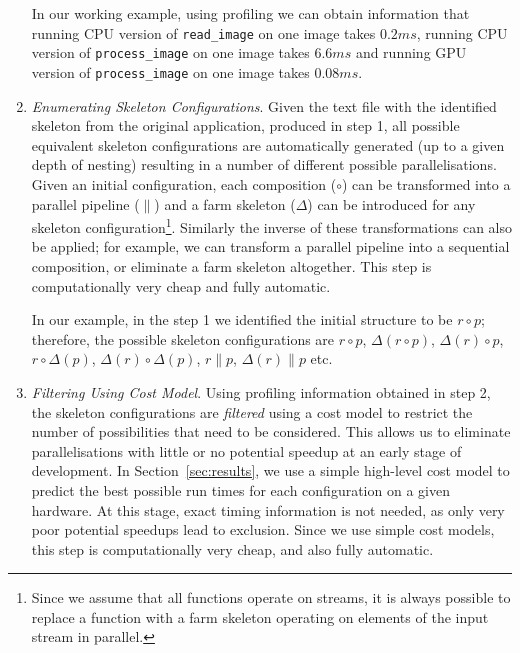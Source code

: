 \documentclass[smallextended]{svjour3}
\begin{document}
\begin{enumerate}
  In our working example, using profiling we can obtain information that
  running CPU version of \lstinline|read_image| on one image takes $0.2ms$, running
  CPU version of \lstinline|process_image| on one image takes $6.6ms$ and running
  GPU version of \lstinline|process_image| on one image takes $0.08ms$.

\item \emph{Enumerating Skeleton Configurations}. Given the text file
  with the identified skeleton from the original application, produced
  in step 1, all possible
  equivalent skeleton configurations are automatically generated (up to a given depth of nesting)
  resulting in a number of different possible parallelisations. 
  Given an initial configuration, each composition ($\circ$) can be transformed into a parallel pipeline ($\parallel$) and
  a farm skeleton ($\Delta$) can be introduced for any skeleton configuration\footnote{Since we assume that all functions operate on streams, it is always possible to replace a function with a farm skeleton operating on elements of the input stream in parallel.}. Similarly the inverse of these transformations
  can also be applied; for example, we can transform a parallel
  pipeline into a sequential composition, or eliminate a farm skeleton
  altogether. This step is computationally very cheap and fully automatic.

  In our example, in the step 1 we identified the initial structure to be $r \circ p$;  therefore, the possible
  skeleton configurations are $r \circ p$, $\Delta(r \circ p)$, $\Delta(r) \circ
  p$, $r \circ \Delta(p)$, $\Delta(r) \circ \Delta(p)$, $r \parallel
  p$, $\Delta(r) \parallel p$ etc. 
\item \emph{Filtering Using Cost Model}. Using profiling information
  obtained in step 2, the skeleton configurations are \emph{filtered} using a cost model
  to restrict the number of possibilities that need to be considered.
  This allows us to eliminate parallelisations with little or no potential
  speedup at an early stage of development.  In
  Section~\ref{sec:results}, we use a simple high-level cost model to predict
  the best possible run times for each configuration on a given hardware. At
  this stage, exact timing information is not needed, as only very
  poor potential speedups lead to exclusion. Since we use
  simple cost models, this step is computationally very cheap, and
  also fully automatic.


\end{enumerate}
\end{document}
